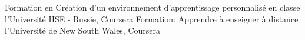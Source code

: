 %
%
%


\begin{scholarship}
	{Formation en Création d'un environnement d'apprentissage personnalisé en classe l'Université HSE - Russie, Coursera} %
	{Formation: Apprendre à enseigner à distance l'Université de New South Wales, Coursera} %

\end{scholarship}
